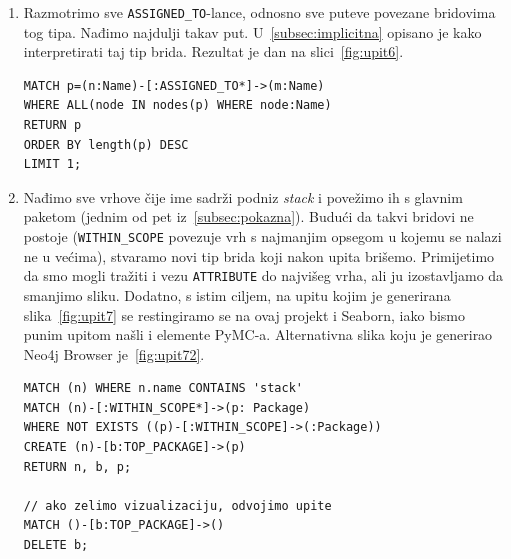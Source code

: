 \begin{enumerate}
\item Razmotrimo sve \texttt{ASSIGNED_\-TO}-lance, odnosno sve
puteve povezane bridovima tog tipa. Nađimo najdulji takav put.
U~\ref{subsec:implicitna} opisano je kako interpretirati taj tip brida.
Rezultat je dan na slici~\ref{fig:upit6}.

\begin{lstlisting}
MATCH p=(n:Name)-[:ASSIGNED_TO*]->(m:Name)
WHERE ALL(node IN nodes(p) WHERE node:Name)
RETURN p
ORDER BY length(p) DESC
LIMIT 1;
\end{lstlisting}

\item Nađimo sve vrhove čije ime sadrži podniz \emph{stack} i povežimo
ih s glavnim paketom (jednim od pet iz~\ref{subsec:pokazna}). Budući da
takvi bridovi ne postoje (\texttt{WITHIN_\-SCOPE} povezuje vrh s 
najmanjim opsegom u kojemu se nalazi ne u većima), stvaramo novi
tip brida koji nakon upita brišemo. Primijetimo da
smo mogli tražiti i vezu \texttt{ATTRIBUTE} do najvišeg vrha,
ali ju izostavljamo da smanjimo sliku. Dodatno, s istim ciljem,
na upitu kojim je generirana slika~\ref{fig:upit7} se restingiramo se na ovaj projekt
i Seaborn, iako bismo punim upitom našli i elemente PyMC-a. Alternativna
slika koju je generirao Neo4j Browser je~\ref{fig:upit72}.

\begin{lstlisting}
MATCH (n) WHERE n.name CONTAINS 'stack'
MATCH (n)-[:WITHIN_SCOPE*]->(p: Package)
WHERE NOT EXISTS ((p)-[:WITHIN_SCOPE]->(:Package))
CREATE (n)-[b:TOP_PACKAGE]->(p)
RETURN n, b, p;

// ako zelimo vizualizaciju, odvojimo upite
MATCH ()-[b:TOP_PACKAGE]->()
DELETE b;
\end{lstlisting}

\end{enumerate}




